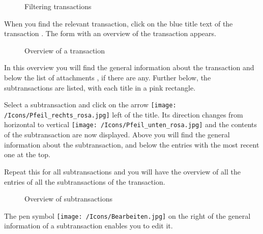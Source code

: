 \begin{figure}[H]
\caption{Filtering transactions}
\end{figure}

When you find the relevant transaction, click on the blue title text of the transaction . The form with an overview of the transaction appears.

\begin{figure}[H]
\caption{Overview of a transaction}
\end{figure}

In this overview you will find the general information about the transaction  and below the list of attachments , if there are any. Further below, the subtransactions  are listed, with each title in a pink rectangle.

\vspace{\baselineskip}

Select a subtransaction and click on the arrow \texttt{[image: /Icons/Pfeil\_rechts\_rosa.jpg]} left of the title. Its direction changes from horizontal to vertical \texttt{[image: /Icons/Pfeil\_unten\_rosa.jpg]} and the contents of the subtransaction are now displayed. Above you will find the general information about the subtransaction, and below the entries with the most recent one at the top.

\vspace{\baselineskip}

Repeat this for all subtransactions and you will have the overview of all the entries of all the subtransactions of the transaction.

\begin{figure}[H]
\caption{Overview of subtransactions}
\end{figure}

The pen symbol \texttt{[image: /Icons/Bearbeiten.jpg]}  on the right of the general information of a subtransaction enables you to edit it.

